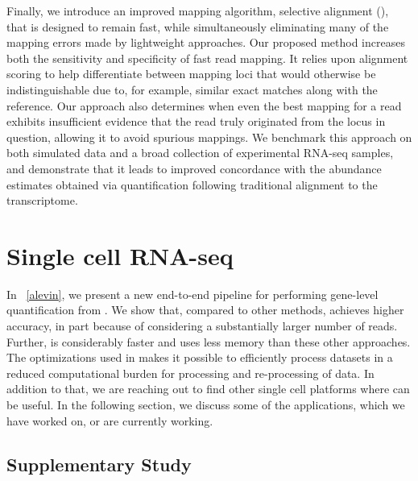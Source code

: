 Finally, we introduce an improved mapping algorithm, selective alignment (\hsa),
that is designed to remain fast, while simultaneously eliminating many of the
mapping errors made by lightweight approaches. Our proposed method increases
both the sensitivity and specificity of fast read mapping. It relies upon
alignment scoring to help differentiate between mapping loci that would
otherwise be indistinguishable due to, for example, similar exact matches along with
the reference. Our approach also determines when even the best mapping for a
read exhibits insufficient evidence that the read truly originated from the
locus in question, allowing it to avoid spurious mappings. We benchmark this
approach on both simulated data and a broad collection of experimental
RNA-seq samples, and demonstrate that it leads to improved
concordance with the abundance estimates obtained via quantification following
traditional alignment to the transcriptome.

\section{Single cell RNA-seq}
In ~\cref{alevin}, we present a new end-to-end pipeline for performing gene-level 
quantification from \dscrnaseq. We show that, compared to other methods, \alevin achieves
 higher accuracy, in part because of considering a substantially larger number
of reads. Further, \alevin is considerably faster and uses less memory than
these other approaches. The optimizations used in \alevin makes it possible to 
efficiently process \dscrnaseq datasets in a reduced computational burden for 
processing and re-processing of \dscrnaseq data. In addition to that, we are reaching out to 
find other single cell platforms where \alevin can be useful. 
In the following section, we discuss some of the applications, which we have worked on, 
or are currently working.

\subsection{Supplementary Study}
